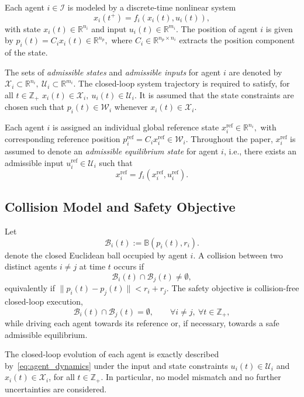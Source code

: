 \documentclass[twocolumn]{autart}
\begin{document}
Each agent \(i \in \mathcal{I}\) is modeled by a discrete-time nonlinear
system
\begin{equation}
x_i(t^+) = f_i(x_i(t),u_i(t)),
\label{eq:agent_dynamics}
\end{equation}
with state \(x_i(t) \in \mathbb{R}^{n_i}\) and input
\(u_i(t) \in \mathbb{R}^{m_i}\). The position of agent \(i\) is given by
\(
p_i(t) = C_i x_i(t) \in \mathbb{R}^{n_p},
\)
where \(C_i \in \mathbb{R}^{n_p \times n_i}\) extracts the position
component of the state.

The sets of \emph{admissible states} and \emph{admissible inputs} for agent \(i\) are denoted by
\(
\mathcal X_i \subset \mathbb{R}^{n_i}, \ \mathcal U_i \subset \mathbb{R}^{m_i}.
\)
The closed-loop system trajectory is required to satisfy, for all $t \in \mathbb{Z}_+$
\(
x_i(t) \in \mathcal X_i, \ u_i(t) \in \mathcal U_i.
\)
It is assumed that the state constraints are chosen such that $p_i(t) \in \mathcal W_i$ whenever $x_i(t) \in \mathcal X_i$.

Each agent \(i\) is assigned an individual global reference state
\(
x_i^{\mathrm{ref}} \in \mathbb{R}^{n_i},
\)
with corresponding reference position
\(
p_i^{\mathrm{ref}} = C_i x_i^{\mathrm{ref}} \in \mathcal W_i.
\)
Throughout the paper, \(x_i^{\mathrm{ref}}\) is assumed to denote an
\emph{admissible equilibrium state} for agent \(i\), i.e., there exists an
admissible input \(u_i^{\mathrm{ref}} \in \mathcal U_i\) such that
\[
x_i^{\mathrm{ref}}
=
f_i(x_i^{\mathrm{ref}},u_i^{\mathrm{ref}}).
\]
\subsection{Collision Model and Safety Objective}
\label{subsec:collision}
Let 
\[
\mathcal B_i(t) := \mathbb{B}(p_i(t),r_i).
\]
denote the closed Euclidean ball occupied by agent $i$. A collision between two distinct agents $i\neq j$ at time $t$ occurs if
\[
\mathcal B_i(t)\cap \mathcal B_j(t)\neq\emptyset,
\]
equivalently if $\|p_i(t)-p_j(t)\| < r_i+r_j$.
The safety objective is collision-free closed-loop execution,
\[
\mathcal B_i(t)\cap \mathcal B_j(t)=\emptyset, \qquad \forall i\neq j,\ \forall t\in\mathbb{Z}_+,
\]
while driving each agent towards its reference or, if necessary, towards a safe admissible equilibrium.

\begin{assumption}
\label{ass:exact_dynamics}
The closed-loop evolution of each agent is exactly described by~\eqref{eq:agent_dynamics} under the input and state constraints $u_i(t)\in\mathcal U_i$ and $x_i(t)\in\mathcal X_i$, for all $t\in\mathbb{Z}_+$. In particular, no model mismatch and no further uncertainties are considered.
\end{assumption}
\end{document}
